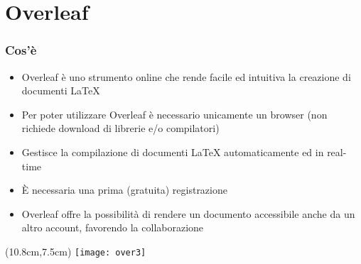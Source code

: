 \section{Overleaf}
  \begin{frame}
    \frametitle{Cos'è}
    
    \begin{itemize}
      \item Overleaf è uno strumento online che rende facile ed intuitiva la creazione di documenti \LaTeX{}
      \item Per poter utilizzare Overleaf è necessario unicamente un browser (non richiede download di librerie e/o compilatori)
      \item Gestisce la compilazione di documenti \LaTeX{} automaticamente ed in real-time
      \item È necessaria una prima (gratuita) registrazione
      \item Overleaf offre la possibilità di rendere un documento accessibile anche da un altro account, favorendo
      la collaborazione
    \end{itemize}
    
    \begin{textblock*}{5cm}(10.8cm,7.5cm)
      \texttt{[image: over3]}
    \end{textblock*}

  \end{frame}
